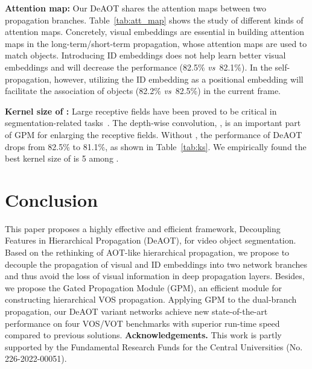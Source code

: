 \documentclass{article}
\def\vs{\emph{vs}~}
\begin{document}
\textbf{Attention map:} Our DeAOT shares the attention maps between two propagation branches. Table~\ref{tab:att_map} shows the study of different kinds of attention maps. Concretely, visual embeddings are essential in building attention maps in the long-term/short-term propagation, whose attention maps are used to match objects. Introducing ID embeddings does not help learn better visual embeddings and will decrease the performance (82.5\% \vs 82.1\%). In the self-propagation, however, utilizing the ID embedding as a positional embedding will facilitate the association of objects (82.2\% \vs 82.5\%) in the current frame.

\textbf{Kernel size of :} Large receptive fields have been proved to be critical in segmentation-related tasks~\cite{deeplabv3p}. The depth-wise convolution, , is an important part of GPM for enlarging the receptive fields. Without , the performance of DeAOT drops from 82.5\% to 81.1\%, as shown in Table~\ref{tab:ks}. We empirically found the best kernel size of  is 5 among . 
\section{Conclusion}
This paper proposes a highly effective and efficient framework, Decoupling Features in Hierarchical Propagation (DeAOT), for video object segmentation. Based on the rethinking of AOT-like hierarchical propagation, we propose to decouple the propagation of visual and ID embeddings into two network branches and thus avoid the loss of visual information in deep propagation layers. Besides, we propose the Gated Propagation Module (GPM), an efficient module for constructing hierarchical VOS propagation. Applying GPM to the dual-branch propagation, our DeAOT variant networks achieve new state-of-the-art performance on four VOS/VOT benchmarks with superior run-time speed compared to previous solutions. 
\noindent \textbf{Acknowledgements.} This work is partly supported by the Fundamental Research Funds for the Central Universities (No. 226-2022-00051).




{


}
\end{document}
